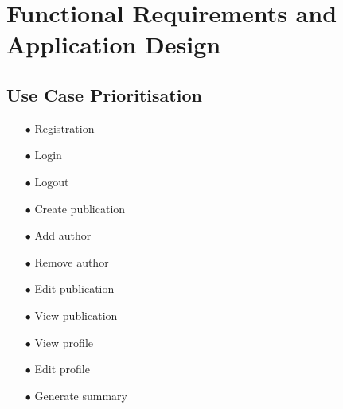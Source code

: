\documentclass[a4paper,12pt]{article}
\begin{document}
\newpage
\section{Functional Requirements and Application Design}
\subsection{Use Case Prioritisation}
\begin{itemize}
	\item[$\bullet$]Registration
	\item[$\bullet$]Login
	\item[$\bullet$]Logout
	\item[$\bullet$]Create publication
	\item[$\bullet$]Add author
	\item[$\bullet$]Remove author
	\item[$\bullet$]Edit publication
	\item[$\bullet$]View publication
	\item[$\bullet$]View profile
	\item[$\bullet$]Edit profile
	\item[$\bullet$]Generate summary
	\\
\end{itemize}
\end{document}

